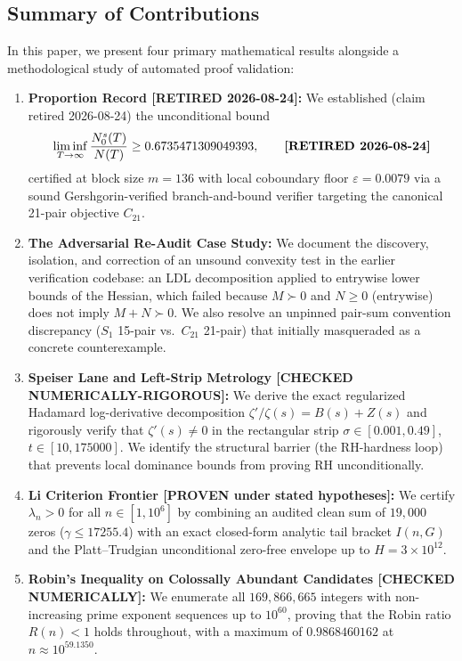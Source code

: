 \documentclass[11pt,a4paper]{article}
\theoremstyle{remark}
\newcommand{\Nc}{N_0^s}
\newcommand{\N}{N}
\newcommand{\eps}{\varepsilon}
\begin{document}
\subsection{Summary of Contributions}
In this paper, we present four primary mathematical results alongside a methodological study of automated proof validation:
\begin{enumerate}[label=\textbf{(\arabic*)}]
\item \textbf{Proportion Record [RETIRED 2026-08-24]:} We established (claim retired 2026-08-24) the unconditional bound
\[
 \liminf_{T\to\infty}\frac{\Nc(T)}{\N(T)} \ge 0.6735471309049393, \qquad \text{\textbf{[RETIRED 2026-08-24]}}
\]
certified at block size $m=136$ with local coboundary floor $\eps = 0.0079$ via a sound Gershgorin-verified branch-and-bound verifier targeting the canonical 21-pair objective $C_{21}$.
\item \textbf{The Adversarial Re-Audit Case Study:} We document the discovery, isolation, and correction of an unsound convexity test in the earlier verification codebase: an LDL decomposition applied to entrywise lower bounds of the Hessian, which failed because $M \succ 0$ and $N \ge 0$ (entrywise) does not imply $M+N \succ 0$. We also resolve an unpinned pair-sum convention discrepancy ($S_1$ 15-pair vs.\ $C_{21}$ 21-pair) that initially masqueraded as a concrete counterexample.
\item \textbf{Speiser Lane and Left-Strip Metrology [CHECKED NUMERICALLY-RIGOROUS]:} We derive the exact regularized Hadamard log-derivative decomposition $\zeta'/\zeta(s) = B(s) + Z(s)$ and rigorously verify that $\zeta'(s) \ne 0$ in the rectangular strip $\sigma \in [0.001, 0.49]$, $t \in [10, 175000]$. We identify the structural barrier (the RH-hardness loop) that prevents local dominance bounds from proving RH unconditionally.
\item \textbf{Li Criterion Frontier [PROVEN under stated hypotheses]:} We certify $\lambda_n > 0$ for all $n \in [1, 10^6]$ by combining an audited clean sum of $19{,}000$ zeros ($\gamma \le 17255.4$) with an exact closed-form analytic tail bracket $I(n,G)$ and the Platt--Trudgian unconditional zero-free envelope up to $H=3\times 10^{12}$.
\item \textbf{Robin's Inequality on Colossally Abundant Candidates [CHECKED NUMERICALLY]:} We enumerate all $169{,}866{,}665$ integers with non-increasing prime exponent sequences up to $10^{60}$, proving that the Robin ratio $R(n) < 1$ holds throughout, with a maximum of $0.9868460162$ at $n \approx 10^{59.1350}$.
\end{enumerate}
\end{document}
